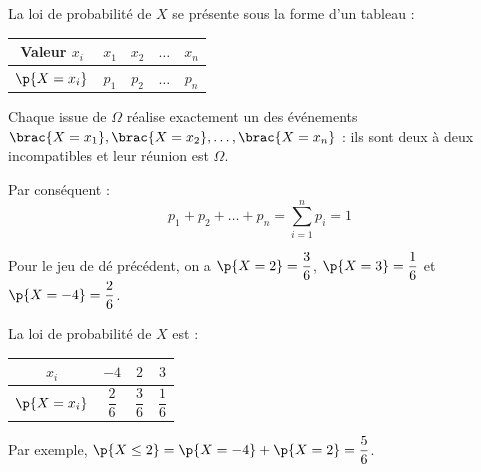 \begin{rem}
	La loi de probabilité de $X$ se présente sous la forme d'un tableau :

	\begin{center}
		\begin{tabular}{|c|c|c|c|c|} \hline
			\ccg\textbf{Valeur} $x_i$               & $x_1$ & $x_2$ & $\dots$ & $x_n$ \\ \hline
			\ccg\rule[-4mm]{0mm}{11mm}$\p{X = x_i}$ & $p_1$ & $p_2$ & $\dots$ & $p_n$ \\ \hline
		\end{tabular}
	\end{center}

	Chaque issue de $\Omega$ réalise exactement un des événements $\brac{X = x_1}, \brac{X = x_2}, \dots, \brac{X = x_n}$ : ils sont deux à deux incompatibles et leur réunion est $\Omega$.

	Par conséquent :
	\[
		p_1 + p_2 + \dots + p_n = \sum_{i=1}^{n} p_i = 1
	\]

\end{rem}

\begin{ex}
	Pour le jeu de dé précédent, on a $\p{X = 2} = \dfrac{3}{6}$, $\p{X = 3} = \dfrac{1}{6}$ et $\p{X = -4} = \dfrac{2}{6}$.

	La loi de probabilité de $X$ est :

	\begin{center}
		\begin{tabular}{|c|c|c|c|} \hline
			\ccg$x_i$                                   & $-4$           & $2$            & $3$            \\ \hline
			\ccg\ccg\rule[-4mm]{0mm}{11mm}$\p{X = x_i}$ & $\dfrac{2}{6}$ & $\dfrac{3}{6}$ & $\dfrac{1}{6}$ \\ \hline
		\end{tabular}
	\end{center}

	Par exemple, $\p{X \leq 2} = \p{X = -4} + \p{X = 2} = \dfrac{5}{6}$.
\end{ex}

